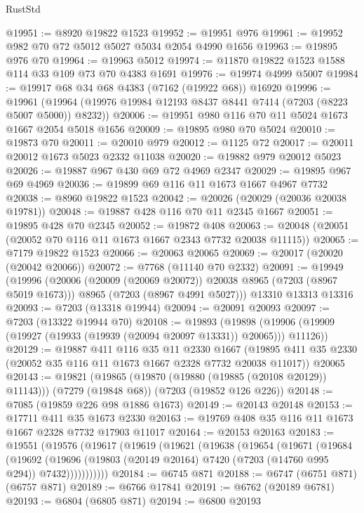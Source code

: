 \begin{lexlean}{RustStd}
\begin{coremodule}
@19951 := @8920 @19822 @1523
@19952 := @19951 @976
@19961 := @19952 @982 @70 @72 @5012 @5027 @5034 @2054 @4990 @1656
@19963 := @19895 @976 @70
@19964 := @19963 @5012
@19974 := @11870 @19822 @1523 @1588 @114 @33 @109 @73 @70 @4383 @1691
@19976 := @19974 @4999 @5007
@19984 := @19917 @68 @34 @68 @4383 (@7162 (@19922 @68)) @16920
@19996 := @19961 (@19964 (@19976 @19984 @12193 @8437 @8441 @7414 (@7203 (@8223 @5007 @5000)) @8232))
@20006 := @19951 @980 @116 @70 @11 @5024 @1673 @1667 @2054 @5018 @1656
@20009 := @19895 @980 @70 @5024
@20010 := @19873 @70
@20011 := @20010 @979
@20012 := @1125 @72
@20017 := @20011 @20012 @1673 @5023 @2332 @11038
@20020 := @19882 @979 @20012 @5023
@20026 := @19887 @967 @430 @69 @72 @4969 @2347
@20029 := @19895 @967 @69 @4969
@20036 := @19899 @69 @116 @11 @1673 @1667 @4967 @7732
@20038 := @8960 @19822 @1523
@20042 := @20026 (@20029 (@20036 @20038 @19781))
@20048 := @19887 @428 @116 @70 @11 @2345 @1667
@20051 := @19895 @428 @70 @2345
@20052 := @19872 @408
@20063 := @20048 (@20051 (@20052 @70 @116 @11 @1673 @1667 @2343 @7732 @20038 @11115))
@20065 := @7179 @19822 @1523
@20066 := @20063 @20065
@20069 := @20017 (@20020 (@20042 @20066))
@20072 := @7768 (@11140 @70 @2332)
@20091 := @19949
    (@19996
      (@20006 (@20009 (@20069 @20072)) @20038 @8965 (@7203 (@8967 @5019 @1673)))
      @8965
      (@7203 (@8967 @4991 @5027)))
    @13310
    @13313
    @13316
@20093 := @7203 (@13318 @19944)
@20094 := @20091 @20093
@20097 := @7203 (@13322 @19944 @70)
@20108 := @19893
    (@19898 (@19906 (@19909 (@19927 (@19933 (@19939 (@20094 @20097 @13331)) @20065))) @11126))
@20129 := @19887
    @411
    @116
    @35
    @11
    @2330
    @1667
    (@19895 @411 @35 @2330 (@20052 @35 @116 @11 @1673 @1667 @2328 @7732 @20038 @11017))
    @20065
@20143 := @19821
    (@19865 (@19870 (@19880 (@19885 (@20108 @20129)) @11143)))
    (@7279 (@19848 @68))
    (@7203 (@19852 @126 @226))
@20148 := @7085 (@19859 @226 @98 @1886 @1673)
@20149 := @20143 @20148
@20153 := @17711 @411 @35 @1673 @2330
@20163 := @19769 @408 @35 @116 @11 @1673 @1667 @2328 @7732 @17903 @11017
@20164 := @20153 @20163
@20183 := @19551
    (@19576
      (@19617
        (@19619
          (@19621
            (@19638
              (@19654
                (@19671
                  (@19684
                    (@19692
                      (@19696
                        (@19803 (@20149 @20164) @7420 (@7203 (@14760 @995 @294)) @7432)))))))))))
@20184 := @6745 @871
@20188 := @6747 (@6751 @871) (@6757 @871)
@20189 := @6766 @17841
@20191 := @6762 (@20189 @6781)
@20193 := @6804 (@6805 @871)
@20194 := @6800 @20193

\end{coremodule}
\end{lexlean}
